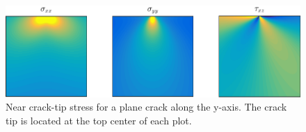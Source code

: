 \begin{figure}
\centering
\includegraphics[width=\textwidth]{../figures/thesis/analytic_stress.pdf}
\caption{Near crack-tip stress for a plane crack along the y-axis. The crack tip is located at the top center of each plot.}
\label{fig:analytic_stress}
\end{figure}

